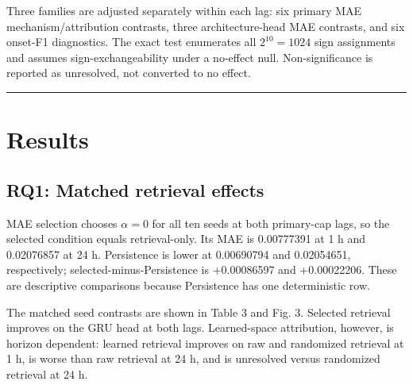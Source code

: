 \documentclass{ieeeaccess}
\begin{document}
Three families are adjusted separately within each lag: six primary MAE mechanism/attribution contrasts, three architecture-head MAE contrasts, and six onset-F1 diagnostics. The exact test enumerates all \(2^{10}=1024\) sign assignments and assumes sign-exchangeability under a no-effect null. Non-significance is reported as unresolved, not converted to no effect.

\begin{center}\rule{0.5\linewidth}{0.5pt}\end{center}

\section{Results}\label{results}

\subsection{RQ1: Matched retrieval effects}\label{rq1-matched-retrieval-effects}

MAE selection chooses \(\alpha=0\) for all ten seeds at both primary-cap lags, so the selected condition equals retrieval-only. Its MAE is 0.00777391 at 1 h and 0.02076857 at 24 h. Persistence is lower at 0.00690794 and 0.02054651, respectively; selected-minus-Persistence is +0.00086597 and +0.00022206. These are descriptive comparisons because Persistence has one deterministic row.

The matched seed contrasts are shown in Table 3 and Fig. 3. Selected retrieval improves on the GRU head at both lags. Learned-space attribution, however, is horizon dependent: learned retrieval improves on raw and randomized retrieval at 1 h, is worse than raw retrieval at 24 h, and is unresolved versus randomized retrieval at 24 h.
\end{document}
